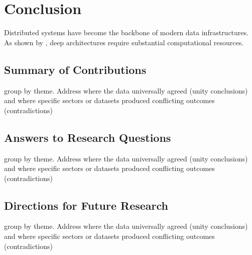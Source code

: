 \chapter{Conclusion}
\label{chap:conclusion}

Distributed systems have become the backbone of modern data infrastructures. As shown by \textcite{vaswani2017attention}, deep architectures require substantial computational resources.


\section{Summary of Contributions}
\label{sec:findingsSummary}

group by theme. Address where the data universally agreed (unity conclusions) and where specific sectors or datasets produced conflicting outcomes (contradictions)


\section{Answers to Research Questions}
\label{sec:answerResearchQuestions}

group by theme. Address where the data universally agreed (unity conclusions) and where specific sectors or datasets produced conflicting outcomes (contradictions)


\section{Directions for Future Research}
\label{sec:developmentPotential}

group by theme. Address where the data universally agreed (unity conclusions) and where specific sectors or datasets produced conflicting outcomes (contradictions)